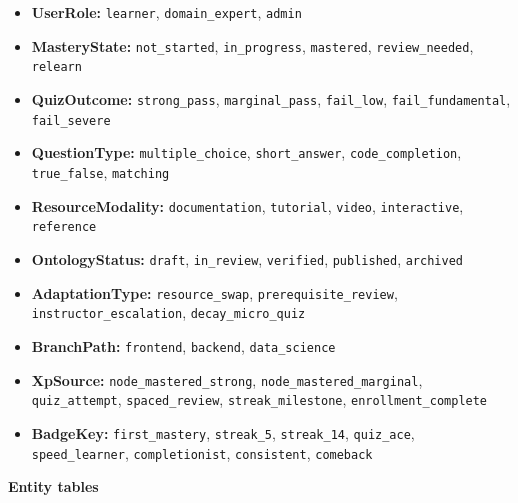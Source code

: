 \begin{itemize}
    \item \textbf{UserRole:} \texttt{learner}, \texttt{domain\_expert}, \texttt{admin}
    \item \textbf{MasteryState:} \texttt{not\_started}, \texttt{in\_progress}, \texttt{mastered}, \texttt{review\_needed}, \texttt{relearn}
    \item \textbf{QuizOutcome:} \texttt{strong\_pass}, \texttt{marginal\_pass}, \texttt{fail\_low}, \texttt{fail\_fundamental}, \texttt{fail\_severe}
    \item \textbf{QuestionType:} \texttt{multiple\_choice}, \texttt{short\_answer}, \texttt{code\_completion}, \texttt{true\_false}, \texttt{matching}
    \item \textbf{ResourceModality:} \texttt{documentation}, \texttt{tutorial}, \texttt{video}, \texttt{interactive}, \texttt{reference}
    \item \textbf{OntologyStatus:} \texttt{draft}, \texttt{in\_review}, \texttt{verified}, \texttt{published}, \texttt{archived}
    \item \textbf{AdaptationType:} \texttt{resource\_swap}, \texttt{prerequisite\_review}, \texttt{instructor\_escalation}, \texttt{decay\_micro\_quiz}
    \item \textbf{BranchPath:} \texttt{frontend}, \texttt{backend}, \texttt{data\_science}
    \item \textbf{XpSource:} \texttt{node\_mastered\_strong}, \texttt{node\_mastered\_marginal}, \texttt{quiz\_attempt}, \texttt{spaced\_review}, \texttt{streak\_milestone}, \texttt{enrollment\_complete}
    \item \textbf{BadgeKey:} \texttt{first\_mastery}, \texttt{streak\_5}, \texttt{streak\_14}, \texttt{quiz\_ace}, \texttt{speed\_learner}, \texttt{completionist}, \texttt{consistent}, \texttt{comeback}
\end{itemize}

\textbf{Entity tables}

